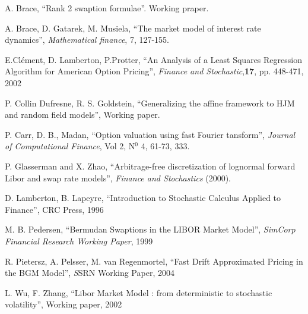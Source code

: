 
\begin{thebibliography}{1}

 A. Brace, ``Rank 2 swaption formulae''. Working praper.
 
 A. Brace, D. Gatarek, M. Musiela, ``The market model of interest rate dynamics'', {\it Mathematical finance}, 7, 127-155.

 E.Cl\'ement, D. Lamberton, P.Protter, ``An Analysis of a Least Squares Regression Algorithm for American Option Pricing'', {\it Finance and Stochastic},\textbf{17}, pp. 448-471, 2002

 P. Collin Dufresne, R. S. Goldstein, ``Generalizing the affine framework to HJM and random field models'', Working paper.

 P. Carr, D. B., Madan, ``Option valuation using fast Fourier tansform'', {\it Journal of Computational Finance}, Vol 2, N$^0$ 4, 61-73, 333.


 P. Glasserman and X. Zhao, ``Arbitrage-free discretization of lognormal forward Libor and swap rate models'', {\it Finance and Stochastics} (2000).

 D. Lamberton, B. Lapeyre, ``Introduction to Stochastic Calculus Applied to Finance'', CRC Press, 1996

 M. B. Pedersen, ``Bermudan Swaptions in the LIBOR Market Model'', {\it SimCorp Financial Research Working Paper}, 1999

 R. Pietersz, A. Pelsser, M. van Regenmortel, ``Fast Drift Approximated Pricing in the BGM Model'', {\emph SSRN Working Paper}, 2004

 L. Wu, F. Zhang, ``Libor Market Model : from deterministic to stochastic volatility'', Working paper, 2002




\end{thebibliography}


